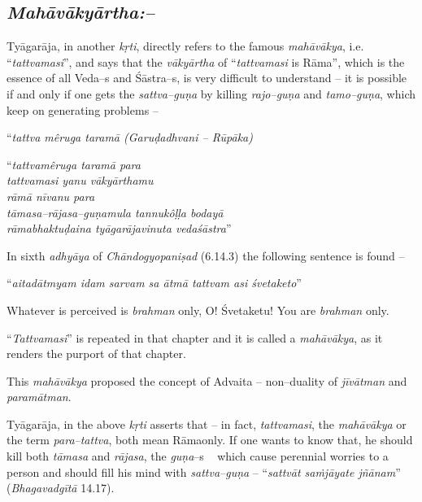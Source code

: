 \subsection*{\textit{Mahāvākyārtha:–}}

Tyāgarāja, in another \textit{kṛti}, directly refers to the famous \textit{mahāvākya}, i.e. “\textit{tattvamasi}”, and says that the \textit{vākyārtha} of “\textit{tattvamasi} is Rāma”, which is the essence of all Veda–s and Śāstra–s, is very difficult to understand – it is possible if and only if one gets the \textit{sattva–guṇa} by killing \textit{rajo–guṇa} and \textit{tamo–guṇa}, which keep on generating problems –

\begin{myquote}
“\textit{tattva mêruga taramā (Garuḍadhvani – Rūpāka)}
\end{myquote}

\begin{myquote}
“\textit{tattvamêruga taramā para}\\\textit{tattvamasi yanu vākyārthamu}\\\textit{rāmā nīvanu para}\\\textit{tāmasa–rājasa–guṇamula tannukôḷḷa bodayā}\\\textit{rāmabhaktuḍaina tyāgarājavinuta vedaśāstra}”
\end{myquote}

In sixth \textit{adhyāya} of \textit{Chāndogyopaniṣad} (6.14.3) the following sentence is found –

\begin{myquote}
“\textit{aitadātmyam idam sarvam sa ātmā tattvam asi śvetaketo}”
\end{myquote}

Whatever is perceived is \textit{brahman} only, O! Śvetaketu! You are \textit{brahman} only.

“\textit{Tattvamasi}” is repeated in that chapter and it is called a \textit{mahāvākya}, as it renders the purport of that chapter.

This \textit{mahāvākya} proposed the concept of Advaita – non–duality of \textit{jīvātman} and \textit{paramātman}.

Tyāgarāja, in the above \textit{kṛti} asserts that – in fact, \textit{tattvamasi}, the \textit{mahāvākya} or the term \textit{para–tattva}, both mean Rāmaonly. If one wants to know that, he should kill both \textit{tāmasa} and \textit{rājasa}, the \textit{guṇa}–s   which cause perennial worries to a person and should fill his mind with \textit{sattva–guṇa} – “\textit{sattvāt saṁjāyate jñānam}” (\textit{Bhagavadgītā} 14.17).


